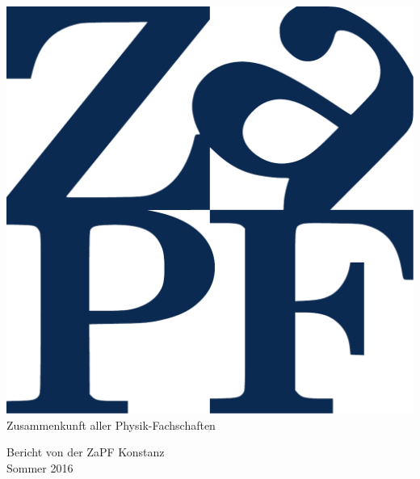 \documentclass{scrartcl}
\begin{document}
	\hspace{0.74\textwidth}
	\begin{minipage}{0.25\textwidth}
		\vspace{-1cm}
		\centering
		\includegraphics[width=.89\textwidth]{logo.pdf}
		\small Zusammenkunft aller Physik-Fachschaften
	\end{minipage}
	
	\begin{center}
		\vspace{1.5cm}
		\huge{Bericht von der ZaPF Konstanz \\ Sommer 2016}
		\vspace{1cm}
	\end{center}
	
	
	
\end{document}
